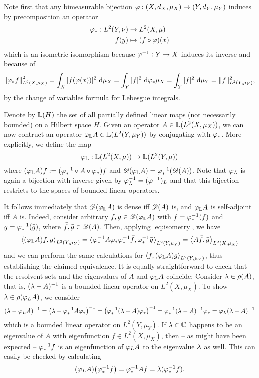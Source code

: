 Note first that any bimeasurable bijection $\varphi:(X,d_X,\mu_X)\to(Y,d_Y,\mu_Y)$ induces by precomposition an operator
\begin{align*}
  \varphi_*:L^2(Y,\nu)&\to L^2(X,\mu)\\
  f(y)&\mapsto(f\circ\varphi)(x)
\end{align*}
which is an isometric isomorphism because $\varphi^{-1}:Y\to X$ induces its inverse and because of
\begin{equation}\label{eq:isometry}
  \left\|\varphi_*f\right\|_{L^2(X,\mu_X)}^2
  =\int_X |f(\varphi(x))|^2\,\operatorname{d}\!\mu_X
  =\int_Y |f|^2\,\operatorname{d}\!\varphi_*\mu_X
  =\int_Y |f|^2\,\operatorname{d}\!\mu_Y
  =\|f\|_{L^2(Y,\mu_Y)}^2,
\end{equation}
by the change of variables formula for Lebesgue integrals. 

Denote by $\mathbb{L}(H)$ the set of all partially defined linear maps (not necessarily bounded) on a Hilbert space $H$. Given an operator $A\in\mathbb{L}(L^2(X,\mu_X))$, we can now contruct an operator $\varphi_{\mathbb{L}} A\in\mathbb{L}(L^2(Y,\mu_Y))$ by conjugating with $\varphi_*$. More explicitly, we define the map
\[
  \varphi_{\mathbb{L}}:\mathbb{L}(L^2(X,\mu))\to\mathbb{L}(L^2(Y,\mu))
\]
where $(\varphi_{\mathbb{L}} A)f:=(\varphi_*^{-1}\circ A\circ\varphi_*)f$ and $\mathscr{D}(\varphi_{\mathbb{L}} A)=\varphi_*^{-1}(\mathscr{D}(A))$. Note that $\varphi_L$ is again a bijection with inverse given by $\varphi_L^{-1}=(\varphi^{-1})_L$ and that this bijection restricts to the spaces of bounded linear operators. 

It follows immediately that $\mathscr{D}(\varphi_{\mathbb{L}} A)$ is dense iff $\mathscr{D}(A)$ is, and $\varphi_{\mathbb{L}} A$ is self-adjoint iff $A$ is. Indeed, consider arbitrary $f,g\in\mathscr{D}(\varphi_{\mathbb{L}} A)$ with $f=\varphi_*^{-1}(\bar f)$ and $g=\varphi_*^{-1}(\bar g)$, where $\bar f, \bar g\in \mathscr{D}(A)$. Then, applying \eqref{eq:isometry}, we have
\[
  \left<(\varphi_{\mathbb{L}} A)f,g\right>_{L^2(Y,\mu_Y)}
  =\left<\varphi_*^{-1}A\varphi_*\varphi_*^{-1}\bar f,\varphi_*^{-1}\bar g\right>_{L^2(Y,\mu_Y)}
  =\left<A\bar f,\bar g\right>_{L^2(X,\mu_X)}
\]
and we can perform the same calculations for $\left<f,(\varphi_{\mathbb{L}} A)g\right>_{L^2(Y,\mu_Y)}$, thus establishing the claimed equivalence. It is equally straightforward to check that the resolvent sets and the eigenvalues of $A$ and $\varphi_{\mathbb{L}} A$ coincide: Consider $\lambda\in\rho(A)$, that is, 
$(\lambda-A)^{-1}$ is a bounded linear operator on $L^2(X,\mu_X)$. To show $\lambda\in\rho(\varphi_L A)$, we consider
\[
  (\lambda-\varphi_L A)^{-1}
  =\left(\lambda-\varphi_*^{-1}A\varphi_*\right)^{-1}
  =\left(\varphi_*^{-1}(\lambda-A)\varphi_*\right)^{-1}
  =\varphi_*^{-1}(\lambda-A)^{-1}\varphi_*
  =\varphi_L(\lambda-A)^{-1}
\]
which is a bounded linear operator on $L^2(Y,\mu_Y)$. If $\lambda\in\mathbb{C}$ happens to be an eigenvalue of $A$ with eigenfunction $f\in L^2(X,\mu_X)$, then -- as might have been expected -- $\varphi_*^{-1}f$ is an eigenfunction of 
$\varphi_L A$ to the eigenvalue $\lambda$ as well. This can easily be checked by calculating
\[
  (\varphi_L A)\big(\varphi_*^{-1}f\big)=\varphi_*^{-1}Af=\lambda(\varphi_*^{-1}f).
\]


